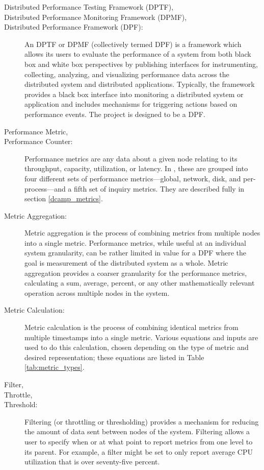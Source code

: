 \begin{description}

\item[Distributed Performance Testing Framework (DPTF),]
\item[Distributed Performance Monitoring Framework (DPMF),]
\item[Distributed Performance Framework (DPF):]

An DPTF or DPMF (collectively termed DPF) is a framework which allows its users to evaluate the performance of a system
from both black box and white box perspectives by publishing interfaces for instrumenting, collecting, analyzing, and
visualizing performance data across the distributed system and distributed applications. Typically, the framework
provides a black box interface into monitoring a distributed system or application and includes mechanisms for
triggering actions based on performance events. The \dcamp project is designed to be a DPF. 

\item[Performance Metric,]
\item[Performance Counter:]
Performance metrics are any data about a given node relating to its throughput, capacity, utilization, or latency. In
\dcampns, these are grouped into four different sets of performance metrics---global, network, disk, and
per-process---and a fifth set of inquiry metrics. They are described fully in section \ref{dcamp_metrics}. 

\item[Metric Aggregation:]
Metric aggregation is the process of combining metrics from multiple nodes into a single metric. Performance metrics,
while useful at an individual system granularity, can be rather limited in value for a DPF where the goal is measurement
of the distributed system as a whole. Metric aggregation provides a coarser granularity for the performance metrics,
calculating a sum, average, percent, or any other mathematically relevant operation across multiple nodes in the system. 

\item[Metric Calculation:]
Metric calculation is the process of combining identical metrics from multiple timestamps into a single metric. Various
equations and inputs are used to do this calculation, chosen depending on the type of metric and desired representation;
these equations are listed in Table \ref{tab:metric_types}.

\item[Filter,]
\item[Throttle,]
\item[Threshold:]
Filtering (or throttling or thresholding) provides a mechanism for reducing the amount of data sent between nodes of the
system. Filtering allows a user to specify when or at what point to report metrics from one level to its parent. For
example, a filter might be set to only report average CPU utilization that is over seventy-five percent. 


\end{description}
